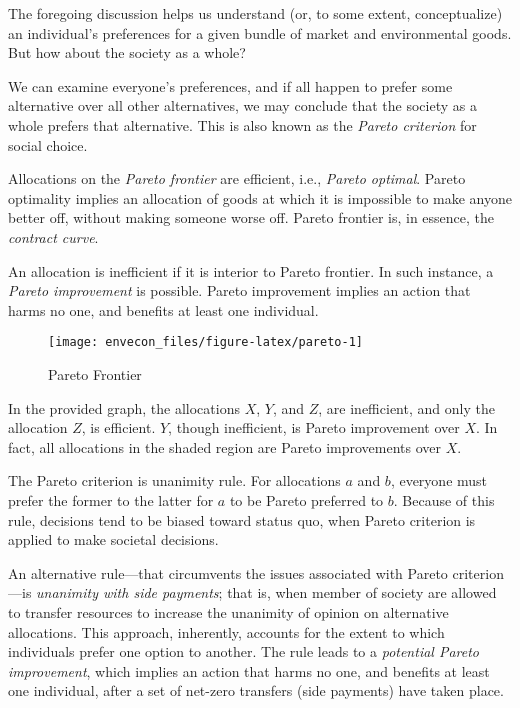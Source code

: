 \documentclass[
]{book}
\begin{document}
The foregoing discussion helps us understand (or, to some extent, conceptualize) an individual's preferences for a given bundle of market and environmental goods. But how about the society as a whole?

We can examine everyone's preferences, and if all happen to prefer some alternative over all other alternatives, we may conclude that the society as a whole prefers that alternative. This is also known as the \emph{Pareto criterion} for social choice.

Allocations on the \emph{Pareto frontier} are efficient, i.e., \emph{Pareto optimal}. Pareto optimality implies an allocation of goods at which it is impossible to make anyone better off, without making someone worse off. Pareto frontier is, in essence, the \emph{contract curve}.

An allocation is inefficient if it is interior to Pareto frontier. In such instance, a \emph{Pareto improvement} is possible. Pareto improvement implies an action that harms no one, and benefits at least one individual.

\begin{figure}

{\centering \texttt{[image: envecon\_files/figure-latex/pareto-1]} 

}

\caption{Pareto Frontier}\label{fig:pareto}
\end{figure}

In the provided graph, the allocations \(X\), \(Y\), and \(Z\), are inefficient, and only the allocation \(Z\), is efficient. \(Y\), though inefficient, is Pareto improvement over \(X\). In fact, all allocations in the shaded region are Pareto improvements over \(X\).

The Pareto criterion is unanimity rule. For allocations \(a\) and \(b\), everyone must prefer the former to the latter for \(a\) to be Pareto preferred to \(b\). Because of this rule, decisions tend to be biased toward status quo, when Pareto criterion is applied to make societal decisions.

An alternative rule---that circumvents the issues associated with Pareto criterion---is \emph{unanimity with side payments}; that is, when member of society are allowed to transfer resources to increase the unanimity of opinion on alternative allocations. This approach, inherently, accounts for the extent to which individuals prefer one option to another. The rule leads to a \emph{potential Pareto improvement}, which implies an action that harms no one, and benefits at least one individual, after a set of net-zero transfers (side payments) have taken place.
\end{document}
